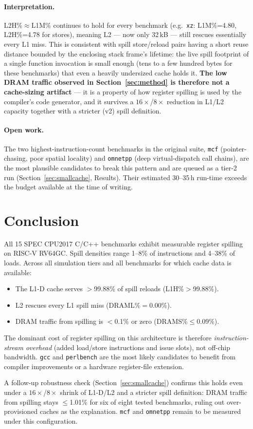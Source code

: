 \documentclass[11pt,a4paper]{article}
\begin{document}
\paragraph{Interpretation.} L2H\%$\approx$L1M\% continues to hold for
every benchmark (e.g.\ \texttt{xz}: L1M\%=4.80, L2H\%=4.78 for
stores), meaning L2 --- now only 32\,kB --- still rescues essentially
every L1 miss. This is consistent with spill store/reload pairs having
a short reuse distance bounded by the enclosing stack frame's
lifetime: the live spill footprint of a single function invocation is
small enough (tens to a few hundred bytes for these benchmarks) that
even a heavily undersized cache holds it. \textbf{The low DRAM traffic
observed in Section~\ref{sec:method} is therefore not a cache-sizing
artifact} --- it is a property of how register spilling is used by the
compiler's code generator, and it survives a $16\times$/$8\times$
reduction in L1/L2 capacity together with a stricter (v2) spill
definition.

\paragraph{Open work.} The two highest-instruction-count benchmarks in
the original suite, \texttt{mcf} (pointer-chasing, poor spatial
locality) and \texttt{omnetpp} (deep virtual-dispatch call chains),
are the most plausible candidates to break this pattern and are
queued as a tier-2 run (Section~\ref{sec:smallcache}, Results). Their
estimated 30--35\,h run-time exceeds the budget available at the time
of writing.

\section{Conclusion}

All 15 SPEC CPU2017 C/C++ benchmarks exhibit measurable register
spilling on RISC-V RV64GC.  Spill densities range 1--8\% of
instructions and 4--38\% of loads.  Across all simulation tiers
and all benchmarks for which cache data is available:
\begin{itemize}
  \item The L1-D cache serves $>$99.88\% of spill reloads (L1H\%$>$99.88\%).
  \item L2 rescues every L1 spill miss (DRAML\%$=$0.00\%).
  \item DRAM traffic from spilling is $<$0.1\% or zero (DRAMS\%$\leq$0.09\%).
\end{itemize}
The dominant cost of register spilling on this architecture is
therefore \emph{instruction-stream overhead} (added load/store
instructions and issue slots), not off-chip bandwidth.
\texttt{gcc} and \texttt{perlbench} are the most likely candidates
to benefit from compiler improvements or a hardware register-file
extension.

A follow-up robustness check (Section~\ref{sec:smallcache}) confirms
this holds even under a $16\times$/$8\times$ shrink of L1-D/L2 and a
stricter spill definition: DRAM traffic from spilling stays
$\leq$1.01\% for six of eight tested benchmarks, ruling out
over-provisioned caches as the explanation. \texttt{mcf} and
\texttt{omnetpp} remain to be measured under this configuration.
\end{document}

